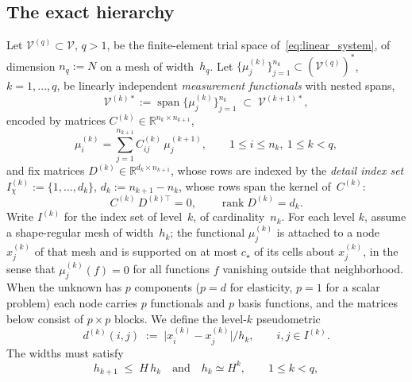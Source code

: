\documentclass[hidelinks]{siamart}
\theoremstyle{nonumberplain}
\numberwithin{theorem}{section}
\begin{document}
\subsection{The exact hierarchy}
Let $\mathcal{V}^{(q)} \subset \mathcal{V}$, $q > 1$, be the
finite-element trial space of~\eqref{eq:linear_system}, of dimension
$n_q := N$ on a mesh of width~$h_q$.  Let
$\{\mu^{(k)}_j\}_{j=1}^{n_k} \subset (\mathcal{V}^{(q)})^*$,
$k = 1,\ldots,q$, be linearly independent \emph{measurement
functionals} with nested spans,
\begin{equation}\label{eq:measurement_nesting}
  \mathcal{V}^{(k)*} := \operatorname{span}\{\mu^{(k)}_j\}_{j=1}^{n_k}
  \;\subset\; \mathcal{V}^{(k+1)*},
\end{equation}
encoded by matrices $C^{(k)} \in \mathbb{R}^{n_k \times n_{k+1}}$,
\begin{equation}\label{eq:nesting_maps}
  \mu^{(k)}_i = \sum_{j=1}^{n_{k+1}} C^{(k)}_{ij}\,\mu^{(k+1)}_j,
  \qquad 1 \leq i \leq n_k,\ 1 \leq k < q,
\end{equation}
and fix matrices $D^{(k)} \in \mathbb{R}^{d_k \times n_{k+1}}$, whose rows
are indexed by the \emph{detail index set} $I^{(k)}_\chi := \{1, \ldots, d_k\}$,
$d_k := n_{k+1} - n_k$, whose rows span the kernel of~$C^{(k)}$:
\begin{equation}\label{eq:kernel_D}
  C^{(k)}\, D^{(k)\top} = 0,
  \qquad \operatorname{rank} D^{(k)} = d_k.
\end{equation}
Write $I^{(k)}$ for the index set of level~$k$,
of cardinality~$n_k$. For each level $k$, assume a shape-regular mesh of
width~$h_k$; the functional $\mu^{(k)}_j$ is attached to a node
$x^{(k)}_j$ of that mesh and is supported on at most $c_\star$ of its
cells about $x^{(k)}_j$, in the sense that $\mu^{(k)}_j(f) = 0$ for all functions $f$ vanishing outside that neighborhood.  When the
unknown has $p$ components ($p = d$ for elasticity, $p = 1$ for a scalar
problem) each node carries $p$ functionals and $p$ basis functions, and
the matrices below consist of $p \times p$ blocks.  We define the
level-$k$ pseudometric
\begin{equation}\label{eq:level_metric}
  d^{(k)}(i,j) \;:=\; \lvert x^{(k)}_i - x^{(k)}_j \rvert / h_k ,
  \qquad i, j \in I^{(k)} .
\end{equation}
The widths must satisfy
\begin{equation}\label{eq:scale_bound}
  h_{k+1} \;\leq\; H\, h_k \quad\text{and}\quad h_k \simeq H^k,
  \qquad 1 \leq k < q ,
\end{equation}
\end{document}
